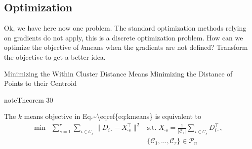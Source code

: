 \documentclass[letterpaper,10pt,english]{jupyterBook}
\begin{document}
\subsection{Optimization}
\label{\detokenize{clustering_k_means:optimization}}
\sphinxAtStartPar
Ok, we have here now one problem.
The standard optimization methods relying on gradients do not apply, this is a discrete optimization problem. How can we optimize the objective of \(k\)\sphinxhyphen{}means when the gradients are not defined?
Transform the objective to get a better idea.

\sphinxAtStartPar
Minimizing the Within Cluster Distance Means Minimizing the Distance of Points to their Centroid
\label{clustering_k_means:theorem-0}
\begin{sphinxadmonition}{note}{Theorem 30}



\sphinxAtStartPar
The \(k\)\sphinxhyphen{} means objective in Eq.\textasciitilde{}\textbackslash{}eqref\{eq:k\sphinxhyphen{}means\} is equivalent to
\begin{align*}
\min&\sum_{s=1}^r\sum_{i\in\mathcal{C}_s} \lVert D_{i\cdot}-X_{\cdot s}^\top\rVert^2
&\text{s.t. }X_{\cdot s}=\frac{1}{|\mathcal{C}_s|}\sum_{i\in\mathcal{C}_s}D_{i\cdot}^\top,\\
&&\{\mathcal{C}_1,\ldots,\mathcal{C}_r\}\in\mathcal{P}_n
\end{align*}\end{sphinxadmonition}
\end{document}
